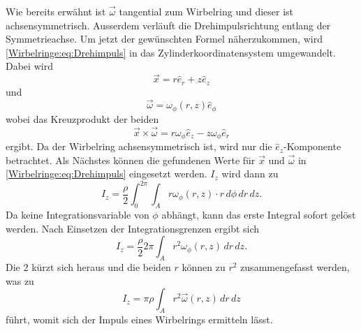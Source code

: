 Wie bereits erwähnt ist \(\vec{\omega}\) tangential zum Wirbelring und dieser ist achsensymmetrisch.
Ausserdem verläuft die Drehimpulsrichtung entlang der Symmetrieachse.
Um jetzt der gewünschten Formel näherzukommen, wird \eqref{Wirbelringe:eq:Drehimpuls} in das Zylinderkoordinatensystem umgewandelt.
Dabei wird
\begin{equation*}
    \vec{x}
    =
    r\hat{e}_r + z\hat{e}_z
\end{equation*}
und
\begin{equation*}
    \vec{\omega}
    =
    \omega_\phi(r,z)\hat{e}_\phi
\end{equation*}
wobei das Kreuzprodukt der beiden 
\begin{equation*}
    \vec{x}\times\vec{\omega}
    =
    r\omega_\phi\hat{e}_z - z\omega_\phi\hat{e}_r
\end{equation*}
ergibt. 
Da der Wirbelring achsensymmetrisch ist, wird nur die \(\hat{e}_z\)-Komponente betrachtet.
Als Nächstes können die gefundenen Werte für \(\vec{x}\) und \(\vec{\omega}\) in \eqref{Wirbelringe:eq:Drehimpuls} eingesetzt werden.
\(I_z\) wird dann zu
\begin{equation*}
    I_z
    =
    \frac{\rho}{2}\int_{0}^{2\pi}\int_{A}r\omega_\phi(r,z)\cdot r\,d\phi \,dr\,dz.
\end{equation*}
Da keine Integrationsvariable von \(\phi\) abhängt, kann das erste Integral sofort gelöst werden. 
Nach Einsetzen der Integrationsgrenzen ergibt sich
\begin{equation*}
    I_z
    =
    \frac{\rho}{2}2\pi\int_{A}r^2\omega_\phi(r,z)\,dr\,dz.
\end{equation*}
Die 2 kürzt sich heraus und die beiden \(r\) können zu \(r^2\) zusammengefasst werden, was zu
\begin{equation}
    I_z
    =
    \pi\rho\int_{A}r^2\vec{\omega}(r,z)\,dr\,dz
    \label{Wirbelringe:eq:achssymImp}
\end{equation}
führt, womit sich der Impuls eines Wirbelrings ermitteln lässt.

